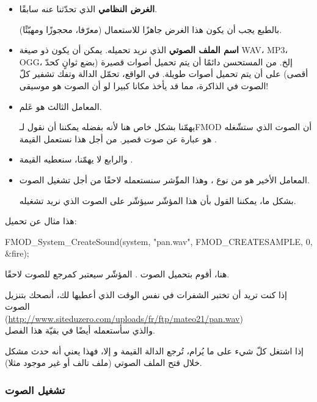 \begin{itemize}
	\item \textbf{الغرض النظامي}
	 الذي تحدّثنا عنه سابقًا.
	
	بالطبع يجب أن يكون هذا الغرض جاهزًا للاستعمال (معرّفا، محجوزًا ومهيّئًا).
	\item \textbf{اسم الملف الصوتي}
	الذي نريد تحميله. يمكن أن يكون ذو صيغة
	\textenglish{WAV}، \textenglish{MP3}، \textenglish{OGG}،
	إلخ. من المستحسن دائمًا أن يتم تحميل أصوات قصيرة (بضع ثوانٍ كحدّ أقصى) على أن يتم تحميل أصوات طويلة. في الواقع، تحمّل الدالة وتفك تشفير كلّ الصوت في الذاكرة، مما قد يأخذ مكانا كبيرا لو أن الصوت هو موسيقى!
	\item المعامل الثالث هو عَلم. 
	
	يهمّنا بشكل خاص هنا لأنه بفضله يمكننا أن نقول لـ\textenglish{FMOD}
	أن الصوت الذي ستشّغله هو عبارة عن صوت قصير. من أجل هذا نستعمل القيمة
	.
	\item والرابع لا يهمّنا، سنعطيه القيمة 
	.
	\item المعامل الأخير هو من نوع
	،
	وهذا المؤّشر سنستعمله لاحقًا من أجل تشغيل الصوت.
	
	بشكل ما، يمكننا القول بأن هذا المؤشّر سيؤشّر على الصوت الذي نريد تشغيله.
\end{itemize}

 هذا مثال عن تحميل:

\begin{Csource}
FMOD_System_CreateSound(system, "pan.wav", FMOD_CREATESAMPLE, 0, &fire);
\end{Csource}

هنا، أقوم بتحميل الصوت
.
المؤشّر
سيعتبر كمرجع للصوت لاحقًا.

\begin{information}
 إذا كنت تريد أن تختبر الشفرات في نفس الوقت الذي أعطيها لك، أنصحك بتنزيل الصوت
\\
 (\url{http://www.siteduzero.com/uploads/fr/ftp/mateo21/pan.wav})\\
 والذي سأستعمله أيضًا في بقيّة هذا الفصل.
\end{information}

إذا اشتغل كلّ شيء على ما يُرام، تُرجع الدالة القيمة
و إلا، فهذا يعني أنه حدث مشكل خلال فتح الملف الصوتي (ملف تالف أو غير موجود مثلا).

\subsubsection{تشغيل الصوت}

